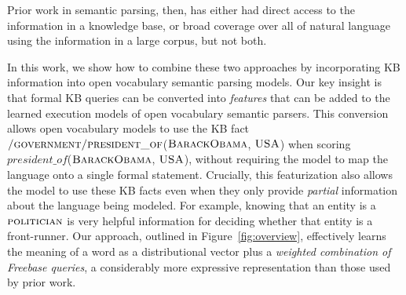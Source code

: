\documentclass[11pt,letterpaper]{article}
\newcommand{\figref}[1]{Figure~\ref{fig:#1}}
\newcommand{\lexicalpredicate}[1]{\ensuremath{\textit{#1}}}
\newcommand{\formalpredicate}[1]{{\small \ensuremath{\textsc{#1}}}}
\begin{document}
\begin{figure*}[ht]

\caption{Overview of the components of our model.  Given an input text, we use a CCG parser and
an entity linker to produce a logical form with predicates derived from the text (shown in
italics).  For each predicate, we learn a distributional vector $\theta$, as well as weights
$\omega$ associated with a set of selected Freebase queries.  For each entity and entity pair, we
learn a distributional vector $\phi$, and we extract a binary feature vector $\psi$ from
Freebase, indicating whether each entity or entity pair is in the set returned by the selected
Freebase queries.  These models are combined to assign probabilities to candidate entities.}
\label{fig:overview}
\end{figure*}

Prior work in semantic parsing, then, has either had direct access to the information in a
knowledge base, or broad coverage over all of natural language using the information in a large
corpus, but not both.

In this work, we show how to combine these two approaches by incorporating KB information into open
vocabulary semantic parsing models.  Our key insight is that formal KB queries can be converted
into \emph{features} that can be added to the learned execution models of open vocabulary semantic
parsers.  This conversion allows open vocabulary models to use the KB fact
\formalpredicate{/government/president\_of}(\formalpredicate{BarackObama}, \formalpredicate{USA})
when scoring \lexicalpredicate{president\_of}(\formalpredicate{BarackObama},
\formalpredicate{USA}), without requiring the model to map the language onto a single formal
statement.  Crucially, this featurization also allows the model to use these KB facts even when
they only provide \emph{partial} information about the language being modeled.  For example,
knowing that an entity is a \formalpredicate{politician} is very helpful information for deciding
whether that entity is a front-runner.  Our approach, outlined in \figref{overview}, effectively
learns the meaning of a word as a distributional vector plus a \emph{weighted combination of
Freebase queries}, a considerably more expressive representation than those used by prior work.
\end{document}
